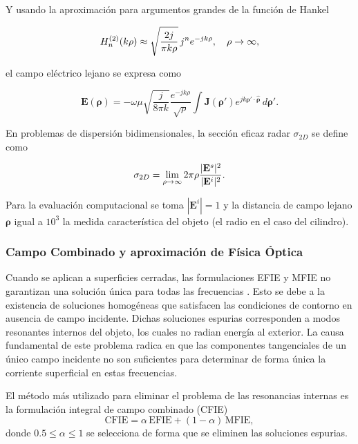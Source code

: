 \documentclass[11pt,a4paper,twoside,pdf]{article}
\numberwithin{equation}{section}
\begin{document}
Y usando la aproximación para argumentos grandes de la función de Hankel

\begin{equation}
H_n^{(2)}(k\rho)
\approx
\sqrt{\frac{2j}{\pi k\rho}}
\, j^n e^{-jk\rho},
\quad \rho \rightarrow \infty,
\notag
\end{equation}

el campo eléctrico lejano se expresa como

\begin{equation}
\mathbf{E}(\boldsymbol{\rho})
=
- \omega \mu
\sqrt{\frac{j}{8\pi k}}
\frac{e^{-jk\rho}}{\sqrt{\rho}}
\int
\mathbf{J}(\boldsymbol{\rho}')
e^{jk \boldsymbol{\rho}' \cdot \hat{\boldsymbol{\rho}}}
\, d\boldsymbol{\rho}'.
\label{Elejano}
\end{equation}

En problemas de dispersión bidimensionales, la sección eficaz radar $\sigma_{2D}$ se define como

\begin{equation}
\sigma_{2D}
= \lim_{\rho \to \infty}
2\pi \rho
\frac{|\mathbf{E}^s|^2}{|\mathbf{E}^i|^2}.
\notag
\end{equation}

Para la evaluación computacional se toma $|\mathbf{E}^i| = 1$ y la distancia de campo lejano $\boldsymbol{\rho}$ igual a $10^3$ la medida característica del objeto (el radio en el caso del cilindro).









\subsubsection{Campo Combinado y aproximación de Física Óptica}

Cuando se aplican a superficies cerradas, las formulaciones EFIE y MFIE no garantizan
una solución única para todas las frecuencias \cite{gibson2021method}. Esto se debe a la existencia de soluciones
homogéneas que satisfacen las condiciones de contorno en ausencia de campo incidente.
Dichas soluciones espurias corresponden a modos resonantes internos del objeto, los
cuales no radian energía al exterior. La causa
fundamental de este problema radica en que las componentes tangenciales de un único
campo incidente no son suficientes para determinar de forma única la corriente
superficial en estas frecuencias.


El método más utilizado para eliminar el problema de las resonancias internas es la
formulación integral de campo combinado (CFIE)
\begin{equation}
\mathrm{CFIE} = \alpha\, \mathrm{EFIE} + (1-\alpha)\, \mathrm{MFIE},
\end{equation}
donde $0.5 \leq \alpha \leq 1$ se selecciona de forma que se eliminen las soluciones espurias.
\end{document}
